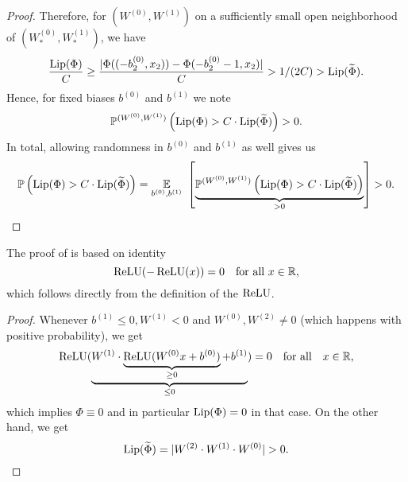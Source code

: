 \begin{proof}
Therefore, for $(W^{(0)}, W^{(1)})$ on a sufficiently small open neighborhood of $(W_\ast^{(0)}, W_\ast^{(1)})$, we have
\begin{equation*}
\frac{\operatorname{Lip}(\Phi)}{C} \geq \frac{\vert \Phi((-b^{(0)}_2, x_2)) - \Phi(-b^{(0)}_2 - 1, x_2) \vert}{C} > 1/(2C) > \operatorname{Lip}(\widetilde{\Phi}).
\end{equation*}
Hence, for fixed biases $b^{(0)}$ and $b^{(1)}$ we note
\begin{equation*}
\mathbb{P}^{(W^{(0)}, W^{(1)})} \left(\operatorname{Lip}(\Phi) > C \cdot \operatorname{Lip}(\widetilde{\Phi})\right)> 0. 
\end{equation*}
In total, allowing randomness in $b^{(0)}$ and $b^{(1)}$ as well gives us
\begin{equation*}
\mathbb{P} \left(\operatorname{Lip}(\Phi) > C \cdot \operatorname{Lip}(\widetilde{\Phi})\right) = \underset{b^{(0)}, b^{(1)}}{\mathbb{E}} \ \left[ \underbrace{\mathbb{P}^{(W^{(0)}, W^{(1)})}\left(\operatorname{Lip}(\Phi)> C \cdot \operatorname{Lip}(\widetilde{\Phi})\right)}_{> 0}\right] > 0. \qedhere
\end{equation*}
\end{proof}
The proof of  is based on identity
\begin{equation*}
\operatorname{ReLU}(-\operatorname{ReLU}(x))= 0 \quad \text{for all }x \in \mathbb{R},
\end{equation*}
which follows directly from the definition of the $\operatorname{ReLU}$.
\renewcommand*{\proofname}{Proof of \Cref{prop:not_working_deep}}
\begin{proof}
Whenever $b^{(1)}\leq 0, W^{(1)} < 0$ and $W^{(0)},W^{(2)} \neq 0$ (which happens with positive probability), we get
\begin{equation*}
\operatorname{ReLU}(\underbrace{W^{(1)}\cdot \underbrace{\operatorname{ReLU}(W^{(0)}x + b^{(0)} )}_{\geq 0} + b^{(1)}}_{\leq 0}) = 0 \quad \text{for all}\quad x \in \mathbb{R},
\end{equation*}	
which implies $\Phi \equiv 0$ and in particular $\operatorname{Lip}(\Phi)=0$ in that case. On the other hand, we get
\begin{equation*}
\operatorname{Lip}(\widetilde{\Phi}) = \vert W^{(2)}\cdot W^{(1)} \cdot W^{(0)}\vert > 0. \qedhere
\end{equation*} 
\end{proof}

\renewcommand*{\proofname}{Proof}
